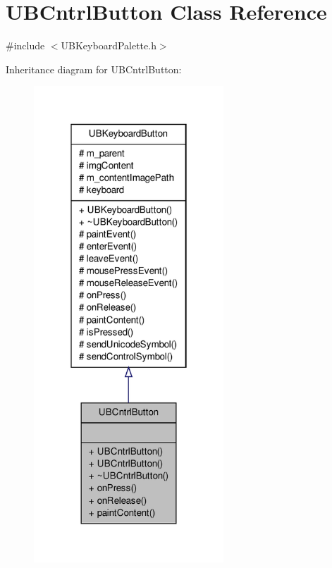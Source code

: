 \hypertarget{class_u_b_cntrl_button}{\section{U\-B\-Cntrl\-Button Class Reference}
\label{d3/db6/class_u_b_cntrl_button}
}


{\ttfamily \#include $<$U\-B\-Keyboard\-Palette.\-h$>$}



Inheritance diagram for U\-B\-Cntrl\-Button\-:
\nopagebreak
\begin{figure}[H]
\begin{center}
\leavevmode
\includegraphics[width=202pt]{dc/d6b/class_u_b_cntrl_button__inherit__graph}
\end{center}
\end{figure}


